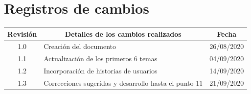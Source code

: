 \documentclass[11pt]{charter}
\begin{document}
\maketitle
\thispagestyle{empty}
\pagebreak


\thispagestyle{empty}
{\setlength{\parskip}{0pt}
\tableofcontents{}
}
\pagebreak

\vspace*{1px}
\section{Registros de cambios}
\label{sec:registro}


\begin{table}[ht]
\label{tab:registro}
\centering
\begin{tabularx}{\linewidth}{@{}|c|X|c|@{}}
\hline
\rowcolor[HTML]{C0C0C0} 
Revisión & \multicolumn{1}{c|}{\cellcolor[HTML]{C0C0C0}Detalles de los cambios realizados} & Fecha      \\ \hline
1.0      & Creación del documento                                          & 26/08/2020 \\ \hline
1.1      & Actualización de los primeros 6 temas                           & 04/09/2020 \\ \hline
1.2      & Incorporación de historias de usuarios                          & 14/09/2020 \\ \hline
1.3      & Correcciones sugeridas y desarrollo hasta el punto 11           & 21/09/2020 \\ \hline
\end{tabularx}
\end{table}

\pagebreak
\end{document}

